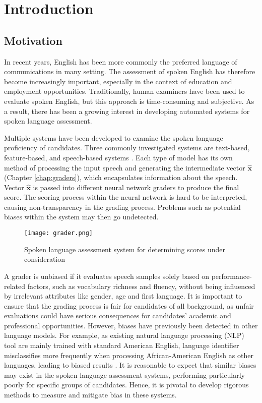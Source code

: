 \chapter{Introduction}

\section{Motivation}
In recent years, English has been more commonly the preferred language of communications in many setting. The assessment of spoken English has therefore become increasingly important, especially in the context of education and employment opportunities. Traditionally, human examiners have been used to evaluate spoken English, but this approach is time-consuming and subjective. As a result, there has been a growing interest in developing automated systems for spoken language assessment.

Multiple systems have been developed to examine the spoken language proficiency of candidates. Three commonly investigated systems are text-based, feature-based, and speech-based systems \cite{graders}. Each type of model has its own method of processing the input speech and generating the intermediate vector $\mathbf{\hat{x}}$ (Chapter \ref{chap:graders}), which encapsulates information about the speech. Vector $\mathbf{\hat{x}}$ is passed into different neural network graders to produce the final score. The scoring process within the neural network is hard to be interpreted, causing non-transparency in the grading process. Problems such as potential biases within the system may then go undetected.

\begin{figure}[H]
    \centering
    \texttt{[image: grader.png]}
    \caption{Spoken language assessment system for determining scores under consideration}
    \label{grader}
\end{figure}

A grader is unbiased if it evaluates speech samples solely based on performance-related factors, such as vocabulary richness and fluency, without being influenced by irrelevant attributes like gender, age and first language. It is important to ensure that the grading process is fair for candidates of all background, as unfair evaluations could have serious consequences for candidates' academic and professional opportunities. However, biases have previously been detected in other language models. For example, as existing natural language processing (NLP) tool are mainly trained with standard American English, language identifier misclassifies more frequently when processing African-American English as other languages, leading to biased results \cite{bias}. It is reasonable to expect that similar biases may exist in the spoken language assessment systems, performing particularly poorly for specific groups of candidates. Hence, it is pivotal to develop rigorous methods to measure and mitigate bias in these systems.

